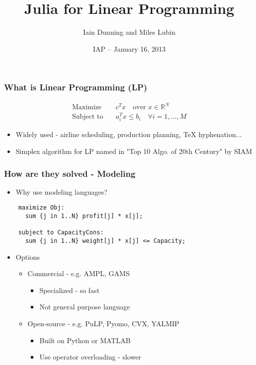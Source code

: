 \documentclass{beamer}
\title{Julia for Linear Programming}
\author{Iain Dunning and Miles Lubin}
\date{IAP -- January 16, 2013}
\institute{MIT}
\begin{document}
\frame{\titlepage}

\begin{frame}
	\frametitle{What is Linear Programming (LP)}
	\begin{align*}
		\text{Maximize}   \quad & c^T x \quad \text{over } x \in \mathbb{R}^N \\
		\text{Subject to} \quad & a^T_i x \leq b_i \quad \forall i=1,\ldots,M
	\end{align*}
	\begin{itemize}
		\item Widely used - airline scheduling, production planning, TeX hyphenation...
		\item Simplex algorithm for LP named in "Top 10 Algo. of 20th Century" by SIAM
	\end{itemize}
\end{frame}

\begin{frame}[fragile]
	\frametitle{How are they solved - Modeling}
	\begin{itemize}
		\item Why use modeling languages?
	\end{itemize}
    \begin{verbatim}
    maximize Obj:
      sum {j in 1..N} profit[j] * x[j];
	  
    subject to CapacityCons:
      sum {j in 1..N} weight[j] * x[j] <= Capacity;
	\end{verbatim}
	\begin{itemize}
		\item Options
		\begin{itemize}
			\item Commercial - e.g. AMPL, GAMS
				\begin{itemize}
					\item Specialized - so fast
					\item Not general purpose language
				\end{itemize}
			\item Open-source - e.g. PuLP, Pyomo, CVX, YALMIP
				\begin{itemize}
					\item Built on Python or MATLAB
					\item Use operator overloading - slower
				\end{itemize}
		\end{itemize}
	\end{itemize}
\end{frame}
\end{document}
